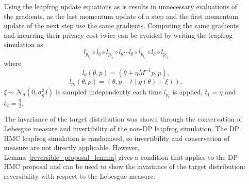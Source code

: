 \documentclass[english,twoside,openright]{HYgraduMLDS}
\newcommand{\caln}{{\mathcal{N}}}
\begin{document}
Using the leapfrog update equations as is results in unnecessary evaluations
of the gradients, as the last momentum update of a step and the first momentum
update of the next step use the same gradients. Computing the same gradients
and incurring their privacy cost
twice can be avoided by writing the leapfrog simulation as
\[
  l_{p_{t_{2}}}\circ l_{\theta}\circ l_{p_{t_{1}}}\circ l_{\theta}\dotsb
  l_{\theta}\circ l_{p_{t_{1}}}\circ l_{\theta}\circ l_{p_{t_{2}}}
\]
where
\[
  l_{\theta}(\theta, p) = (\theta + \eta M^{-1}p, p),
\]
\[
  l_{p_{t}}(\theta, p) = (\theta, p - t(g(\theta) + \xi)),
\]
\(\xi \sim \caln_{d}(0, \sigma_{g}^2I)\) is sampled independently each time
\(l_{p_{t}}\) is applied, \(t_{1} = \eta\) and \(t_{2} = \frac{\eta}{2}\).


%
The invariance of the target distribution was shown through the conservation of
Lebesgue measure and invertibility of the non-DP leapfrog simulation. The
DP HMC leapfrog simulation is randomised, so invertibility and conservation
of measure are not directly applicable. However,
Lemma~\ref{reversible_proposal_lemma} gives a condition that applies to
the DP HMC proposal and can be used to show the invariance of the target
distribution: reversibility with respect to the Lebesgue measure.
\end{document}
